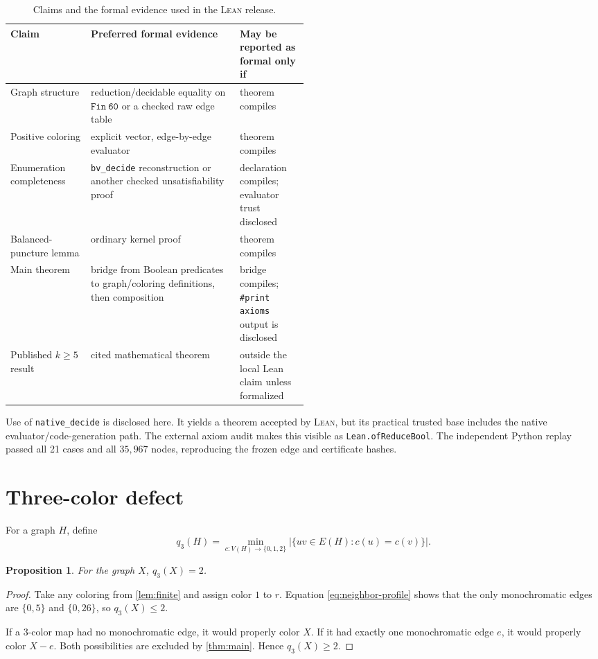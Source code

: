 \documentclass[10pt]{amsart}
\newcommand{\qthree}{q_3}
\newcommand{\lean}{\textsc{Lean}}
\newtheorem{proposition}[theorem]{Proposition}
\theoremstyle{definition}
\begin{document}
\begin{table}[ht]
\centering
\caption{Claims and the formal evidence used in the \lean{} release.}
\label{tab:lean-boundary}
\small
\begin{tabularx}{\linewidth}{@{}>{\raggedright\arraybackslash}p{0.27\linewidth}
>{\raggedright\arraybackslash}X>{\raggedright\arraybackslash}p{0.23\linewidth}@{}}
\toprule
Claim & Preferred formal evidence & May be reported as formal only if\\
\midrule
Graph structure & reduction/decidable equality on $\mathtt{Fin\ 60}$ or a checked raw edge table & theorem compiles\\
Positive coloring & explicit vector, edge-by-edge evaluator & theorem compiles\\
Enumeration completeness & \texttt{bv\_decide} reconstruction or another checked unsatisfiability proof & declaration compiles; evaluator trust disclosed\\
Balanced-puncture lemma & ordinary kernel proof & theorem compiles\\
Main theorem & bridge from Boolean predicates to graph/coloring definitions, then composition & bridge compiles; \texttt{\#print axioms} output is disclosed\\
Published $k\ge5$ result & cited mathematical theorem & outside the local Lean claim unless formalized\\
\bottomrule
\end{tabularx}
\end{table}

Use of \texttt{native\_decide} is disclosed here. It yields a theorem accepted
by \lean{}, but its practical trusted base includes the native
evaluator/code-generation path. The external axiom audit makes this visible as
\texttt{Lean.ofReduceBool}. The independent Python replay passed all 21 cases
and all $35{,}967$ nodes, reproducing the frozen edge and certificate hashes.

\section{Three-color defect}

For a graph $H$, define
\[
 \qthree(H)=\min_{c:V(H)\to\{0,1,2\}}
 \bigl|\{uv\in E(H):c(u)=c(v)\}\bigr|.
\]

\begin{proposition}\label{prop:q3}
For the graph $X$, $\qthree(X)=2$.
\end{proposition}

\begin{proof}
Take any coloring from \cref{lem:finite} and assign color $1$ to $r$.
Equation \eqref{eq:neighbor-profile} shows that the only monochromatic edges
are $\{0,5\}$ and $\{0,26\}$, so $\qthree(X)\leq2$.

If a $3$-color map had no monochromatic edge, it would properly color $X$.
If it had exactly one monochromatic edge $e$, it would properly color $X-e$.
Both possibilities are excluded by \cref{thm:main}.  Hence
$\qthree(X)\geq2$.
\end{proof}
\end{document}
